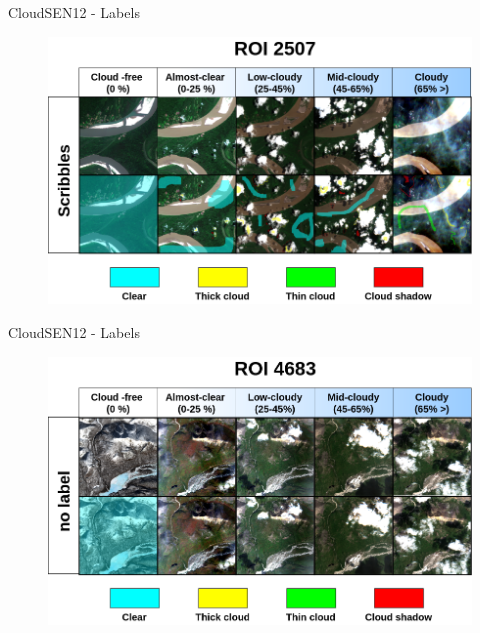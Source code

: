 \begin{frame}{CloudSEN12 - Labels}
	\begin{figure}
		\centering
		\includegraphics[width=0.7\linewidth]{images/labels02}
		\label{fig:labels01}
	\end{figure}
\end{frame}


\begin{frame}{CloudSEN12 - Labels}
	\begin{figure}
		\centering
		\includegraphics[width=0.7\linewidth]{images/labels03}
		\label{fig:labels01}
	\end{figure}
\end{frame}